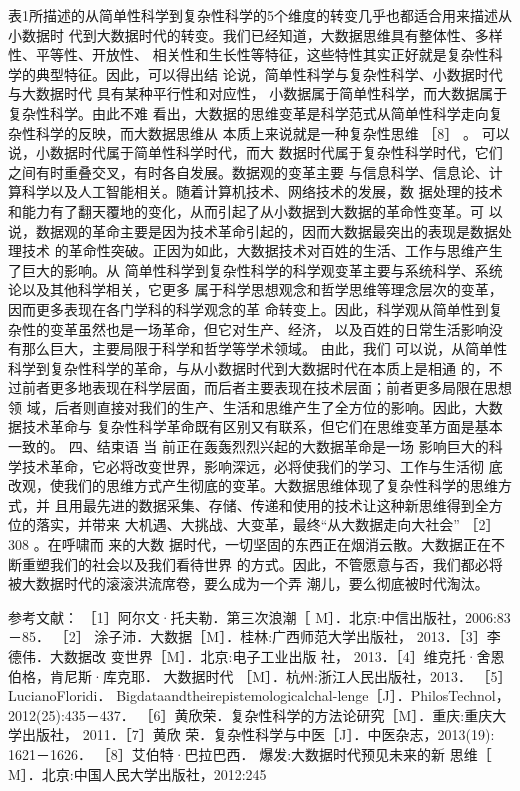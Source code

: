 \documentclass[11pt]{ctexart}
\begin{document}
{{{{表1所描述的从简单性科学到复杂性科学的5个维度的转变几乎也都适合用来描述从小数据时
代到大数据时代的转变。我们已经知道，大数据思维具有整体性、多样性、平等性、开放性、
相关性和生长性等特征，这些特性其实正好就是复杂性科学的典型特征。因此，可以得出结
论说，简单性科学与复杂性科学、小数据时代与大数据时代
具有某种平行性和对应性， 小数据属于简单性科学，而大数据属于复杂性科学。由此不难
看出，大数据的思维变革是科学范式从简单性科学走向复杂性科学的反映，而大数据思维从
本质上来说就是一种复杂性思维 ［8］ 。 可以说，小数据时代属于简单性科学时代，而大
数据时代属于复杂性科学时代，它们之间有时重叠交叉，有时各自发展。数据观的变革主要
与信息科学、信息论、计算科学以及人工智能相关。随着计算机技术、网络技术的发展，数
据处理的技术和能力有了翻天覆地的变化，从而引起了从小数据到大数据的革命性变革。可
以说，数据观的革命主要是因为技术革命引起的，因而大数据最突出的表现是数据处理技术
的革命性突破。正因为如此，大数据技术对百姓的生活、工作与思维产生了巨大的影响。从
简单性科学到复杂性科学的科学观变革主要与系统科学、系统论以及其他科学相关，它更多
属于科学思想观念和哲学思维等理念层次的变革，因而更多表现在各门学科的科学观念的革
命转变上。因此，科学观从简单性到复杂性的变革虽然也是一场革命，但它对生产、经济，
以及百姓的日常生活影响没有那么巨大，主要局限于科学和哲学等学术领域。 由此，我们
可以说，从简单性科学到复杂性科学的革命，与从小数据时代到大数据时代在本质上是相通
的，不过前者更多地表现在科学层面，而后者主要表现在技术层面；前者更多局限在思想领
域，后者则直接对我们的生产、生活和思维产生了全方位的影响。因此，大数据技术革命与
复杂性科学革命既有区别又有联系，但它们在思维变革方面是基本一致的。 四、结束语 当
前正在轰轰烈烈兴起的大数据革命是一场
影响巨大的科学技术革命，它必将改变世界，影响深远，必将使我们的学习、工作与生活彻
底改观，使我们的思维方式产生彻底的变革。大数据思维体现了复杂性科学的思维方式，并
且用最先进的数据采集、存储、传递和使用的技术让这种新思维得到全方位的落实，并带来
大机遇、大挑战、大变革，最终“从大数据走向大社会” ［2］308 。在呼啸而 来的大数
据时代，一切坚固的东西正在烟消云散。大数据正在不断重塑我们的社会以及我们看待世界
的方式。因此，不管愿意与否，我们都必将被大数据时代的滚滚洪流席卷，要么成为一个弄
潮儿，要么彻底被时代淘汰。

参考文献：
［1］阿尔文·托夫勒．第三次浪潮［ M］．北京:中信出版社，2006:83－85．
［2］ 涂子沛．大数据［M］．桂林:广西师范大学出版社， 2013．［3］李德伟．大数据改
变世界［M］．北京:电子工业出版 社， 2013．［4］维克托·舍恩伯格，肯尼斯·库克耶．
大数据时代 ［M］．杭州:浙江人民出版社，2013． ［5］LucianoFloridi．
Bigdataandtheirepistemologicalchal-lenge［J］．PhilosTechnol，2012(25):435－437．
［6］黄欣荣．复杂性科学的方法论研究［M］．重庆:重庆大 学出版社， 2011．［7］黄欣
荣．复杂性科学与中医［J］．中医杂志，2013(19): 1621－1626． ［8］艾伯特·巴拉巴西．
爆发:大数据时代预见未来的新 思维［ M］．北京:中国人民大学出版社，2012:245






}}}}
\end{document}

